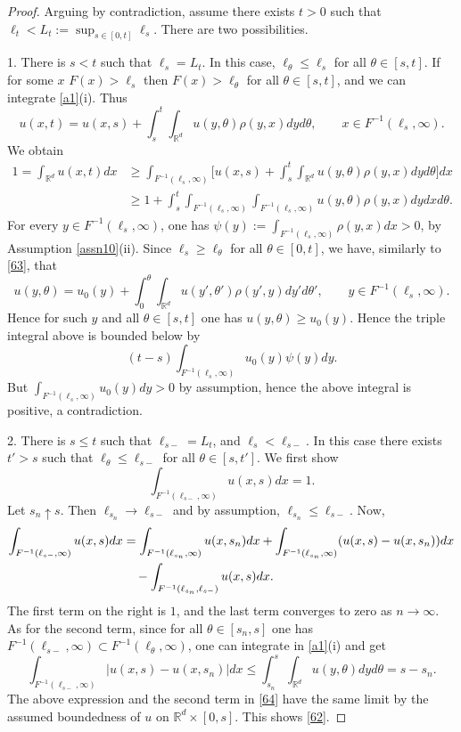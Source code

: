 \documentclass[10pt,a4paper]{amsart}
\newcommand{\F}{F}
\newcommand{\R}{{\mathbb R}}
\newcommand{\iy}{\infty}
\begin{document}
\begin{proof}
Arguing by contradiction, assume
there exists $t>0$ such that $\ell_t<L_t:=\sup_{s\in[0,t]}\ell_s$.
There are two possibilities.

1. There is $s<t$ such that $\ell_s=L_t$.
In this case, $\ell_\theta\le\ell_s$ for all $\theta\in[s,t]$.
If for some $x$ $\F(x)>\ell_s$ then $\F(x)>\ell_\theta$ for all
$\theta\in[s,t]$, and we can integrate \eqref{a1}(i). Thus
\begin{equation}\label{63}
u(x,t)=u(x,s)+\int_s^t\int_{\R^d}u(y,\theta)\rho(y,x)dyd\theta,
\qquad x\in \F^{-1}(\ell_s,\iy).
\end{equation}
We obtain
\begin{align*}
1=\int_{\R^d} u(x,t)dx&\ge\int_{\F^{-1}(\ell_s,\iy)} \Big[u(x,s)
+\int_s^t\int_{\R^d} u(y,\theta)\rho(y,x)dy d\theta \Big]dx\\
&\ge
1 +\int_s^t\int_{\F^{-1}(\ell_s,\iy)}\int_{\F^{-1}(\ell_s,\iy)} u(y,\theta)\rho(y,x)dy dx d\theta.
\end{align*}
For every $y\in \F^{-1}(\ell_s,\iy)$, one has
$\psi(y):=\int_{\F^{-1}(\ell_s,\iy)}\rho(y,x)dx>0$, by Assumption \ref{assn10}(ii).
Since $\ell_s\ge\ell_\theta$ for all $\theta\in[0,t]$,
we have, similarly to \eqref{63}, that
\[
u(y,\theta)=u_0(y)+\int_0^\theta\int_{\R^d}u(y',\theta')\rho(y',y)dy'd\theta',
\qquad y\in \F^{-1}(\ell_s,\iy).
\]
Hence for such $y$ and all $\theta\in[s,t]$ one has $u(y,\theta)\ge u_0(y)$.
Hence the triple integral above is bounded below by
\[
(t-s)\int_{\F^{-1}(\ell_s,\iy)} u_0(y)\psi(y)dy.
\]
But $\int_{\F^{-1}(\ell_s,\iy)}u_0(y)dy>0$ by assumption, hence
the above integral is positive, a contradiction.

2. There is $s\le t$ such that $\ell_{s-}=L_t$, and $\ell_s<\ell_{s-}$.
In this case there exists $t'>s$ such that $\ell_\theta\le\ell_{s-}$ for all $\theta\in[s,t']$.
We first show
\begin{equation}\label{62}
\int_{\F^{-1}(\ell_{s-},\iy)} u(x,s)dx=1.
\end{equation}
Let $s_n\uparrow s$.
Then $\ell_{s_n}\to\ell_{s-}$ and by assumption,
$\ell_{s_n}\le\ell_{s-}$. Now,
\begin{align}\label{64}
\int_{\F^{-1}(\ell_{s-},\iy)}u(x,s)dx
&=\int_{\F^{-1}(\ell_{s_n},\iy)}u(x,s_n)dx
+\int_{\F^{-1}(\ell_{s_n},\iy)}(u(x,s)-u(x,s_n))dx
\\
&\quad-\int_{\F^{-1}(\ell_{s_n},\ell_{s-})} u(x,s)dx.
\notag
\end{align}
The first term on the right is $1$, and the last term converges to zero
as $n\to\iy$. As for the second term,
since for all $\theta\in[s_n,s]$ one has
$\F^{-1}(\ell_{s-},\iy)\subset \F^{-1}(\ell_{\theta},\iy)$,
one can integrate in \eqref{a1}(i) and get
\[
\int_{\F^{-1}(\ell_{s-},\iy)}|u(x,s)-u(x,s_n)|dx
\le\int_{s_n}^s\int_{\R^d}u(y,\theta)dyd\theta=s-s_n.
\]
The above expression and the second term in \eqref{64}
have the same limit by the assumed boundedness of $u$
on $\R^d\times[0,s]$. This shows \eqref{62}.


\end{proof}
\end{document}

